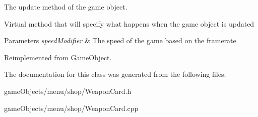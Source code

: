 The update method of the game object. 

Virtual method that will specify what happens when the game object is updated 
\begin{DoxyParams}{Parameters}
{\em speed\+Modifier} & The speed of the game based on the framerate \\
\hline
\end{DoxyParams}


Reimplemented from \hyperlink{class_game_object_acf6423054877d1344b6e0b1f4e740df5}{Game\+Object}.



The documentation for this class was generated from the following files\+:\begin{DoxyCompactItemize}
\item 
game\+Objects/menu/shop/Weapon\+Card.\+h\item 
game\+Objects/menu/shop/Weapon\+Card.\+cpp\end{DoxyCompactItemize}
